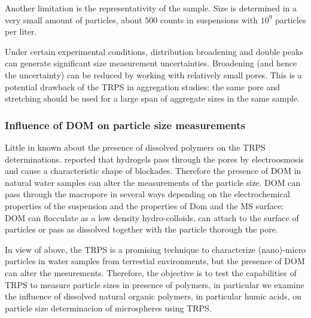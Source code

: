 \documentclass[journal=langd5,manuscript=article]{achemso}
\begin{document}
%
Another limitation is the representativity of the sample. Size is determined in a very small amount of particles, about  $500$ counts in suspensions with $10^9$ particles per liter.



Under certain experimental conditions, distribution broadening and double peaks can generate significant size measurement uncertainties. Broadening (and hence the uncertainty) can be reduced by working with relatively small pores\cite{Weatherall2016}. This is a potential drawback of the TRPS in aggregation studies: the same pore and stretching  should be used for a large span of aggregate sizes in the same sample.

\subsubsection{Influence of DOM on particle size measurements}

Little in known about the presence of dissolved polymers on the TRPS determinations.  \citeauthor{Pevarnik2013}\cite{Pevarnik2013} reported that hydrogels pass through the pores by electroosmosis and cause a characteristic shape of blockades. Therefore the presence of DOM in natural water samples can alter the  measurements of the particle size. DOM can pass through the macropore in several ways depending on the electrochemical properties of the  suspension and the properties of Dom and the MS surface: DOM can flocculate as a low density  hydro-colloids, can attach to the surface of particles or pass as dissolved together with the  particle thorough the pore. 


In view of above, the TRPS is a promising technique to characterize (nano)-micro particles in water samples from terrestial environments, but the presence of DOM can alter the mesurements. Therefore, the objective is to test the capabilities of TRPS to measure  particle sizes in presence of polymers, in particular   we examine the influence of dissolved natural organic polymers, in particular humic acids, on  particle size determinacion of microspheres using TRPS.
\end{document}
